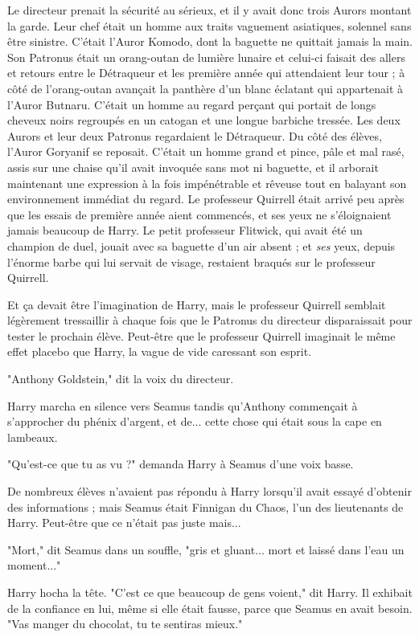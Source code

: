Le directeur prenait la sécurité au sérieux, et il y avait donc trois Aurors montant la garde. Leur chef était un homme aux traits vaguement asiatiques, solennel sans être sinistre. C'était l'Auror Komodo, dont la baguette ne quittait jamais la main. Son Patronus était un orang-outan de lumière lunaire et celui-ci faisait des allers et retours entre le Détraqueur et les première année qui attendaient leur tour ; à côté de l'orang-outan avançait la panthère d'un blanc éclatant qui appartenait à l'Auror Butnaru. C'était un homme au regard perçant qui portait de longs cheveux noirs regroupés en un catogan et une longue barbiche tressée. Les deux Aurors et leur deux Patronus regardaient le Détraqueur. Du côté des élèves, l'Auror Goryanif se reposait. C'était un homme grand et pince, pâle et mal rasé, assis sur une chaise qu'il avait invoquée sans mot ni baguette, et il arborait maintenant une expression à la fois impénétrable et rêveuse tout en balayant son environnement immédiat du regard. Le professeur Quirrell était arrivé peu après que les essais de première année aient commencés, et ses yeux ne s'éloignaient jamais beaucoup de Harry. Le petit professeur Flitwick, qui avait été un champion de duel, jouait avec sa baguette d'un air absent ; et \emph{ses } yeux, depuis l'énorme barbe qui lui servait de visage, restaient braqués sur le professeur Quirrell.

Et ça devait être l'imagination de Harry, mais le professeur Quirrell semblait légèrement tressaillir à chaque fois que le Patronus du directeur disparaissait pour tester le prochain élève. Peut-être que le professeur Quirrell imaginait le même effet placebo que Harry, la vague de vide caressant son esprit.

"Anthony Goldstein," dit la voix du directeur.

Harry marcha en silence vers Seamus tandis qu'Anthony commençait à s'approcher du phénix d'argent, et de... cette chose qui était sous la cape en lambeaux.

"Qu'est-ce que tu as vu ?" demanda Harry à Seamus d'une voix basse.

De nombreux élèves n'avaient pas répondu à Harry lorsqu'il avait essayé d'obtenir des informations ; mais Seamus était Finnigan du Chaos, l'un des lieutenants de Harry. Peut-être que ce n'était pas juste mais...

"Mort," dit Seamus dans un souffle, "gris et gluant... mort et laissé dans l'eau un moment..."

Harry hocha la tête. "C'est ce que beaucoup de gens voient," dit Harry. Il exhibait de la confiance en lui, même si elle était fausse, parce que Seamus en avait besoin. "Vas manger du chocolat, tu te sentiras mieux."

